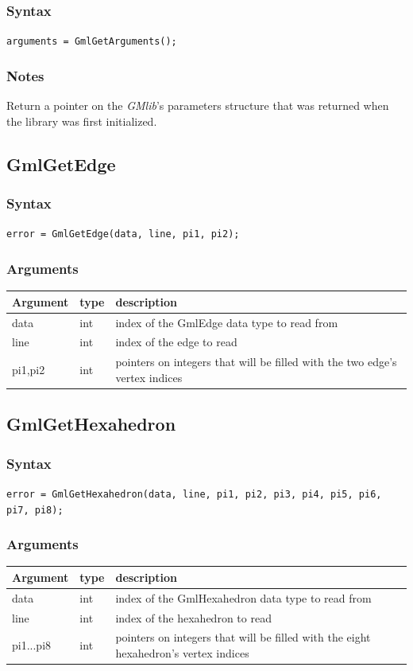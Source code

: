 \documentclass[a4paper,12pt]{article}
\begin{document}
\subsubsection*{Syntax}
{\tt arguments = GmlGetArguments();}
\subsubsection*{Notes}
Return a pointer on the \emph{GMlib}'s parameters structure that was returned when the library was first initialized.


\subsection{GmlGetEdge}
\subsubsection*{Syntax}
{\tt error = GmlGetEdge(data, line, pi1, pi2);}
\subsubsection*{Arguments}

\begin{tabular}{|m{2cm}|m{1.5cm}|m{10.5cm}|}
\hline
Argument   & type   & description \\
\hline
data       & int    & index of the GmlEdge data type to read from \\
\hline
line       & int    & index of the edge to read \\
\hline
pi1,pi2    & int    & pointers on integers that will be filled with the two edge's vertex indices \\
\hline
\end{tabular}


\subsection{GmlGetHexahedron}
\subsubsection*{Syntax}
{\tt error = GmlGetHexahedron(data, line, pi1, pi2, pi3, pi4, pi5, pi6, pi7, pi8);}
\subsubsection*{Arguments}

\begin{tabular}{|m{2cm}|m{1.5cm}|m{10.5cm}|}
\hline
Argument   & type   & description \\
\hline
data       & int    & index of the GmlHexahedron data type to read from \\
\hline
line       & int    & index of the hexahedron to read \\
\hline
pi1...pi8  & int    & pointers on integers that will be filled with the eight hexahedron's vertex indices \\
\hline
\end{tabular}
\end{document}
